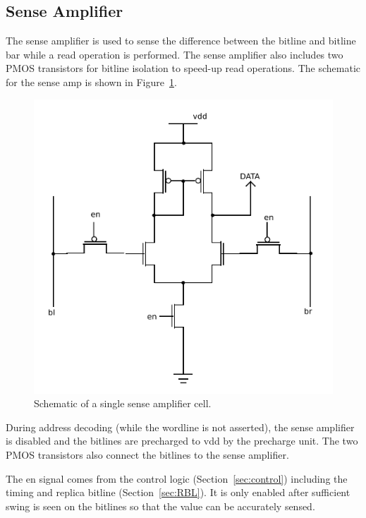 \subsection{Sense Amplifier}
\label{sec:senseamp}
The sense amplifier is used to sense the difference between the
bitline and bitline bar while a read operation is performed.
The sense amplifier also includes two PMOS transistors for bitline
isolation to speed-up read operations. The schematic for the sense amp is shown in
Figure~\ref{fig:sense_amp}.

\begin{figure}[h!]
\centering
\includegraphics[scale=.8]{./figs/sense_amp_schem.pdf}
\caption{Schematic of a single sense amplifier cell.}
\label{fig:sense_amp}
\end{figure}

During address decoding (while the wordline is not asserted), the sense
amplifier is disabled and the bitlines are precharged to vdd by the
precharge unit. The two PMOS transistors also connect the bitlines to the sense amplifier.

The en signal comes from the control logic (Section~\ref{sec:control})
including the timing and replica bitline (Section~\ref{sec:RBL}). It
is only enabled after sufficient swing is seen on the bitlines so that
the value can be accurately sensed.

